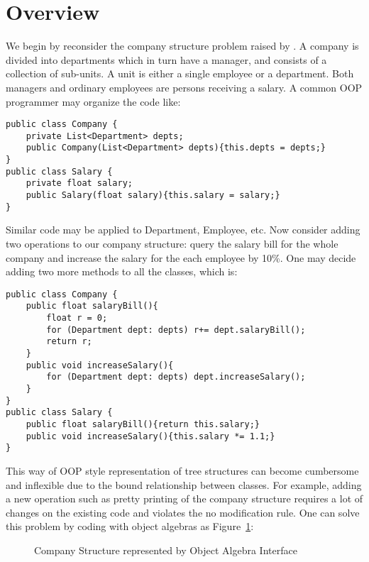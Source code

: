 
\section{Overview}\label{subsec:backgound}

We begin by reconsider the company structure problem raised by \cite{ralf03syb}. A company is divided into departments which in turn have a manager, and consists of a collection of sub-units. A unit is either a single employee or a department. Both managers and ordinary employees are persons receiving a salary. A common OOP programmer may organize the code like: 

\begin{lstlisting}[numbers=none]
public class Company {
	private List<Department> depts;
	public Company(List<Department> depts){this.depts = depts;}
}
public class Salary {
	private float salary;
	public Salary(float salary){this.salary = salary;}
} 
\end{lstlisting}
Similar code may be applied to Department, Employee, etc. Now consider adding two operations to our company structure: query the salary bill for the whole company and increase the salary for the each employee by 10\%. One may decide adding two more methods to all the classes, which is: 
\begin{lstlisting}[numbers=none]
public class Company {
	public float salaryBill(){
		float r = 0; 
		for (Department dept: depts) r+= dept.salaryBill(); 
		return r;
	}
	public void increaseSalary(){
		for (Department dept: depts) dept.increaseSalary();
	}
}
public class Salary {
	public float salaryBill(){return this.salary;}
	public void increaseSalary(){this.salary *= 1.1;}
}
\end{lstlisting}
This way of OOP style representation of tree structures can become cumbersome and inflexible due to the bound relationship between classes. For example, adding a new operation such as pretty printing of the company structure requires a lot of changes on the existing code and violates the no modification rule. One can solve this problem by coding with object algebras as Figure~\ref{syb_tree}: 
\begin{figure}[tb]
\vspace{-.1in}
\caption{Company Structure represented by Object Algebra Interface}
\label{syb_tree}
\end{figure}

